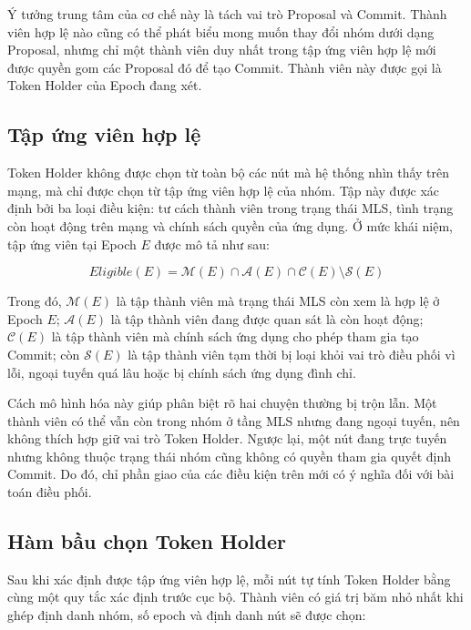 \documentclass[../DoAn.tex]{subfiles}
\begin{document}
Ý tưởng trung tâm của cơ chế này là tách vai trò Proposal và Commit. Thành viên hợp lệ nào cũng có thể phát biểu mong muốn thay đổi nhóm dưới dạng Proposal, nhưng chỉ một thành viên duy nhất trong tập ứng viên hợp lệ mới được quyền gom các Proposal đó để tạo Commit. Thành viên này được gọi là Token Holder của Epoch đang xét.

\subsection{Tập ứng viên hợp lệ}

Token Holder không được chọn từ toàn bộ các nút mà hệ thống nhìn thấy trên mạng, mà chỉ được chọn từ tập ứng viên hợp lệ của nhóm. Tập này được xác định bởi ba loại điều kiện: tư cách thành viên trong trạng thái MLS, tình trạng còn hoạt động trên mạng và chính sách quyền của ứng dụng. Ở mức khái niệm, tập ứng viên tại Epoch $E$ được mô tả như sau:

\begin{equation}
\label{eq:eligible_set}
Eligible(E) = \mathcal{M}(E) \cap \mathcal{A}(E) \cap \mathcal{C}(E) \setminus \mathcal{S}(E)
\end{equation}

Trong đó, $\mathcal{M}(E)$ là tập thành viên mà trạng thái MLS còn xem là hợp lệ ở Epoch $E$; $\mathcal{A}(E)$ là tập thành viên đang được quan sát là còn hoạt động; $\mathcal{C}(E)$ là tập thành viên mà chính sách ứng dụng cho phép tham gia tạo Commit; còn $\mathcal{S}(E)$ là tập thành viên tạm thời bị loại khỏi vai trò điều phối vì lỗi, ngoại tuyến quá lâu hoặc bị chính sách ứng dụng đình chỉ.

Cách mô hình hóa này giúp phân biệt rõ hai chuyện thường bị trộn lẫn. Một thành viên có thể vẫn còn trong nhóm ở tầng MLS nhưng đang ngoại tuyến, nên không thích hợp giữ vai trò Token Holder. Ngược lại, một nút đang trực tuyến nhưng không thuộc trạng thái nhóm cũng không có quyền tham gia quyết định Commit. Do đó, chỉ phần giao của các điều kiện trên mới có ý nghĩa đối với bài toán điều phối.

\subsection{Hàm bầu chọn Token Holder}

Sau khi xác định được tập ứng viên hợp lệ, mỗi nút tự tính Token Holder bằng cùng một quy tắc xác định trước cục bộ. Thành viên có giá trị băm nhỏ nhất khi ghép định danh nhóm, số epoch và định danh nút sẽ được chọn:
\end{document}
